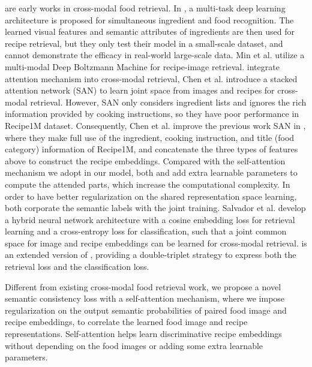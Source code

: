 \documentclass[journal]{IEEEtran}
\begin{document}
\cite{chen2016deep, min2016being} are early works in cross-modal food retrieval. In \cite{chen2016deep}, a multi-task deep learning architecture is proposed for simultaneous ingredient and food recognition. The learned visual features and semantic attributes of ingredients are then used for recipe retrieval, but they only test their model in a small-scale dataset, and cannot demonstrate the efficacy in real-world large-scale data. Min et al. \cite{min2016being} utilize a multi-modal Deep Boltzmann Machine for recipe-image retrieval. \cite{chen2017cross, chen2018deep} integrate attention mechanism into cross-modal retrieval, Chen et al. \cite{chen2017cross} introduce a stacked attention network (SAN) to learn joint space from images and recipes for cross-modal retrieval. However, SAN only considers ingredient lists and ignores the rich information provided by cooking instructions, so they have poor performance in Recipe1M dataset. Consequently, Chen et al. improve the previous work SAN in \cite{chen2018deep}, where they make full use of the ingredient, cooking instruction, and title (food category) information of Recipe1M, and concatenate the three types of features above to construct the recipe embeddings. Compared with the self-attention mechanism we adopt in our model, both \cite{chen2017cross} and \cite{chen2018deep} add extra learnable parameters to compute the attended parts,
which increase the computational complexity. In order to have better regularization on the shared representation space learning, \cite{salvador2017learning, carvalho2018cross} both corporate the semantic labels with the joint training. Salvador et al. \cite{salvador2017learning} develop a hybrid neural network architecture with a cosine embedding loss for retrieval learning and a cross-entropy loss for classification, such that a joint common space for image and recipe embeddings can be learned for cross-modal retrieval. \cite{carvalho2018cross} is an extended version of \cite{salvador2017learning}, providing a double-triplet strategy to express both the retrieval loss and the classification loss.

Different from existing cross-modal food retrieval work, we propose a novel semantic consistency loss with a self-attention mechanism, where we impose regularization on the output semantic probabilities of paired food image and recipe embeddings, to correlate the learned food image and recipe representations. Self-attention helps learn discriminative recipe embeddings without depending on the food images or adding some extra learnable parameters. 
\end{document}
